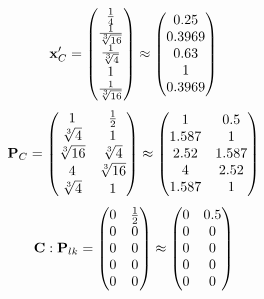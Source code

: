 \documentclass[10pt,a4paper]{article}
\begin{document}
	\[
		\bold{x}'_{C} = 
		\begin{pmatrix}
			\frac{1} {{4}} \\
			\frac{1} {\sqrt[3]{16}} \\
			\frac{1} {\sqrt[3]{4}} \\
			{1} {} \\
			\frac{1} {\sqrt[3]{16}} \\
		\end{pmatrix}
		\approx
		\begin{pmatrix}
			0.25     \\
			0.3969   \\
			0.63     \\
			1        \\
			0.3969   \\
		\end{pmatrix}
	\]
	\[
		\bold{P}_{C} = 
		\begin{pmatrix}
			{1} {} & \frac{1} {{2}} \\
			{\sqrt[3]{4}} {} & {1} {} \\
			{\sqrt[3]{16}} {} & {\sqrt[3]{4}} {} \\
			{{4}} {} & {\sqrt[3]{16}} {} \\
			{\sqrt[3]{4}} {} & {1} {} \\
		\end{pmatrix}
		\approx
		\begin{pmatrix}
			1        & 0.5      \\
			1.587    & 1        \\
			2.52     & 1.587    \\
			4        & 2.52     \\
			1.587    & 1        \\
		\end{pmatrix}
	\]
	\[
		\bold{C}: \bold{P}_{lk} = 
		\begin{pmatrix}
			{{0}} {} & \frac{1} {{2}} \\
			{{0}} {} & {{0}} {} \\
			{{0}} {} & {{0}} {} \\
			{{0}} {} & {{0}} {} \\
			{{0}} {} & {{0}} {} \\
		\end{pmatrix}
		\approx
		\begin{pmatrix}
			0        & 0.5      \\
			0        & 0        \\
			0        & 0        \\
			0        & 0        \\
			0        & 0        \\
		\end{pmatrix}
	\]
\end{document}
